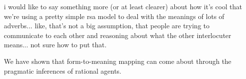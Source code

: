 \documentclass[10pt,letterpaper]{article}
\newcommand{\w}[1]{\emph{#1}}
\newcommand{\todo}[1]{{\color{red}#1}}
\begin{document}
\todo{i would like to say something more (or at least clearer) about how it's cool that we're using a pretty simple rsa model to deal with the meanings of lots of adverbs... like, that's not a big assumption, that people are trying to communicate to each other and reasoning about what the other interlocuter means... not sure how to put that.}

We have shown that form-to-meaning mapping can come about through the pragmatic inferences of rational agents.



\end{document}
